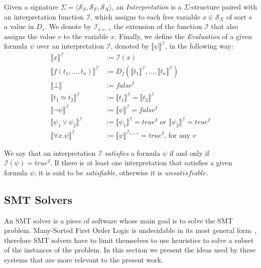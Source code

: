 Given a signature $\Sigma = \langle \mathcal{S}_{S}, \mathcal{S}_{F}, \mathcal{S}_{X} \rangle$, an \textit{Interpretation} is a $\Sigma$-structure paired with an interpretation function $\mathcal{I}$, which assigns to each free variable $x \in \mathcal{S}_{X}$ of sort $s$ a value in $D_{s}$. We denote by $\mathcal{I}_{x \gets v}$ the extension of the function $\mathcal{I}$ that also assigns the value $v$ to the variable $x$. Finally, we define the \textit{Evaluation} of a given formula $\psi$ over an interpretation $\mathcal{I}$, denoted by $\llbracket \psi \rrbracket^{\mathcal{I}}$, in the following way:
\begin{align*}
  \llbracket x \rrbracket^{\mathcal{I}} &:= \mathcal{I}(x) \\
  \llbracket f(t_{1}, \ldots, t_{n}) \rrbracket^{\mathcal{I}} &:= D_{f}(\llbracket t_{1} \rrbracket^{\mathcal{I}}, \ldots, \llbracket t_{n} \rrbracket^{\mathcal{I}}) \\
  \llbracket \bot \rrbracket &:= false^{I} \\
  \llbracket t_{1} \simeq t_{2} \rrbracket^{\mathcal{I}} &:= \llbracket t_{1} \rrbracket^{\mathcal{I}} = \llbracket t_{2} \rrbracket^{\mathcal{I}} \\
  \llbracket \neg \psi \rrbracket^{\mathcal{I}} &:= \llbracket \psi \rrbracket^{\mathcal{I}} = false^{I} \\
  \llbracket \psi_{1} \vee \psi_{2} \rrbracket^{\mathcal{I}} &:= \llbracket \psi_{1} \rrbracket^{\mathcal{I}} = true^{I}\,\, or\,\, \llbracket \psi_{2} \rrbracket^{\mathcal{I}} = true^{I} \\
  \llbracket \forall x . \psi \rrbracket^{\mathcal{I}} &:= \llbracket \psi \rrbracket^{\mathcal{I}_{x \gets v}} = true^{I} \text{, for any } v
\end{align*}

We say that an interpretation $\mathcal{I}$ \textit{satisfies} a formula $\psi$ if and only if $\mathcal{I}(\psi) = true^{I}$. If there is at least
one interpretation that satisfies a given formula $\psi$, it is said to be \textit{satisfiable}, otherwise it is $\textit{unsatisfiable}$.


\subsection{SMT Solvers}

An SMT solver is a piece of software whose main goal is to solve the SMT problem. Many-Sorted First Order Logic is undecidable in its most general form~\cite{fol_undec}, therefore SMT solvers have to limit themselves to use heuristics to solve a subset of the instances of the problem. In this section we present the ideas used by these systems that are more relevant to the present work.

